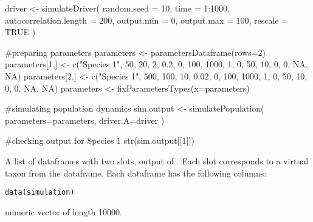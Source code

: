 \documentclass[letterpaper]{book}
\begin{document}
%
\begin{Examples}
\begin{ExampleCode}

driver <- simulateDriver(
 random.seed = 10,
 time = 1:1000,
 autocorrelation.length = 200,
 output.min = 0,
 output.max = 100,
 rescale = TRUE
 )

#preparing parameters
parameters <- parametersDataframe(rows=2)
parameters[1,] <- c("Species 1", 50, 20, 2, 0.2, 0, 100, 1000, 1, 0, 50, 10, 0, 0, NA, NA)
parameters[2,] <- c("Species 1", 500, 100, 10, 0.02, 0, 100, 1000, 1, 0, 50, 10, 0, 0, NA, NA)
parameters <- fixParametersTypes(x=parameters)

#simulating population dynamics
sim.output <- simulatePopulation(
 parameters=parameters,
 driver.A=driver
 )

#checking output for Species 1
str(sim.output[[1]])

\end{ExampleCode}
\end{Examples}
%
\begin{Description}\relax
A list of dataframes with two slots, output of . Each slot corresponds to a virtual taxon from the  dataframe. Each dataframe has the following columns:
\end{Description}
%
\begin{Usage}
\begin{verbatim}
data(simulation)
\end{verbatim}
\end{Usage}
%
\begin{Format}
numeric vector of length 10000.
\end{Format}
%
\end{document}
